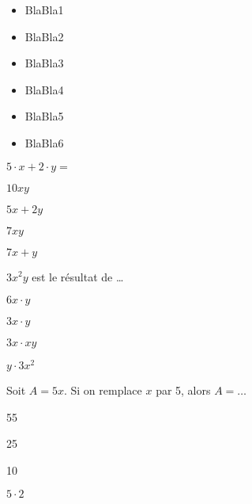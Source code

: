 \begin{acquis}
\begin{itemize}
\item BlaBla1
\item BlaBla2
\item BlaBla3
\item BlaBla4
\item BlaBla5
\item BlaBla6
\end{itemize}
\end{acquis}


\begin{QCM}
  \begin{GroupeQCM}
    \begin{exercice}
      $5 \cdot x + 2 \cdot y =$
      \begin{ChoixQCM}{4}
      \item $10xy$
      \item $5x + 2y$
      \item $7xy$
      \item $7x + y$
      \end{ChoixQCM}
\begin{corrige}
   \end{corrige}
    \end{exercice}
    
    
    \begin{exercice}
      $3x^2y$ est le résultat de \ldots
      \begin{ChoixQCM}{4}
      \item $6x \cdot y$
      \item $3x \cdot y$
      \item $3x \cdot xy$
      \item $y \cdot 3x^2$
      \end{ChoixQCM}
\begin{corrige}
   \end{corrige}
    \end{exercice}
    
    
    \begin{exercice}
      Soit $A = 5x$. Si on remplace $x$ par 5, alors $A = \ldots$
      \begin{ChoixQCM}{4}
      \item 55
      \item 25
      \item 10
      \item $5 \cdot 2$
      \end{ChoixQCM}
\begin{corrige}
   \end{corrige}
    \end{exercice}
    

\end{GroupeQCM}
\end{QCM}
